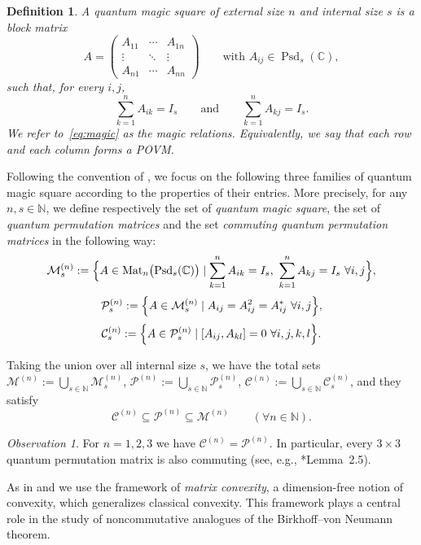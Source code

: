 \documentclass[11pt, a4paper]{article}
\theoremstyle{plain}
\newtheorem{definition}[theorem]{Definition}
\theoremstyle{definition}
\theoremstyle{remark}
\newtheorem{observation}[theorem]{Observation}
\newcommand{\N}{\mathbb{N}}
\newcommand{\C}{\mathbb{C}}
\begin{document}
\begin{definition} 
A \emph{quantum magic square} of external size \(n\) and internal size \(s\) is a block matrix 
\[
A=\begin{pmatrix}
A_{11} & \cdots & A_{1n}\\
\vdots & \ddots & \vdots\\
A_{n1} & \cdots & A_{nn}
\end{pmatrix}
\qquad \text{with } A_{ij}\in \operatorname{Psd}_s(\C),
\]
such that, for every \(i,j\),
\begin{equation}\label{eq:magic}
    \sum_{k=1}^n A_{ik} = I_s 
    \qquad \text{and} \qquad 
    \sum_{k=1}^n A_{kj} = I_s.
\end{equation}
We refer to~\eqref{eq:magic} as the \emph{magic relations}.
Equivalently, we say that each row and each column forms a POVM.
\end{definition}
Following the convention of \cite{DNV23}, we focus on the following three families of quantum magic square according to the properties of their entries. More precisely, for any \(n,s \in \N\), we define respectively the set of \emph{quantum magic square}, the set of \emph{quantum permutation matrices} and the set \emph{commuting quantum permutation matrices} in the following way:
\[ 
\mathcal{M}_s^{(n)} := \Bigl\{ A \in \operatorname{Mat}_n\bigl(\operatorname{Psd}_s(\C)\bigr) \mid \sum_{k=1}^n A_{ik} = I_s,\ \sum_{k=1}^n A_{kj} = I_s \ \forall i,j \Bigr\}, \] \[ \mathcal{P}_s^{(n)} := \Bigl\{ A \in \mathcal{M}_s^{(n)} \mid A_{ij} = A_{ij}^2 = A_{ij}^* \ \forall i,j \Bigr\},
\]
\[ 
\mathcal{C}_s^{(n)} := \Bigl\{ A \in \mathcal{P}_s^{(n)} \mid [A_{ij},A_{kl}]=0 \ \forall i,j,k,l \Bigr\}.
\]

Taking the union over all internal size \(s\), we have the total sets \(\mathcal{M}^{(n)} := \bigcup_{s\in\N} \mathcal{M}_s^{(n)}\), \(\mathcal{P}^{(n)}:= \bigcup_{s\in\N} \mathcal{P}_s^{(n)}\), \(\mathcal{C}^{(n)}:= \bigcup_{s\in\N} \mathcal{C}_s^{(n)}\), and they satisfy
\[ 
\mathcal{C}^{(n)} \subseteq \mathcal{P}^{(n)} \subseteq \mathcal{M}^{(n)} \qquad (\forall n\in\N).
\] 

\begin{observation} For \(n=1,2,3\) we have \(\mathcal{C}^{(n)} = \mathcal{P}^{(n)}\). In particular, every \(3\times 3\) quantum permutation matrix is also commuting (see, e.g., \cite{Web23}*{Lemma~2.5}). \end{observation} 
As in \cite{DDN20} and \cite{DNV23} we use the
framework of \emph{matrix convexity}, a dimension-free notion of
convexity, which generalizes classical convexity. This framework plays a central role in the study of noncommutative analogues of the
Birkhoff--von Neumann theorem.
\end{document}
